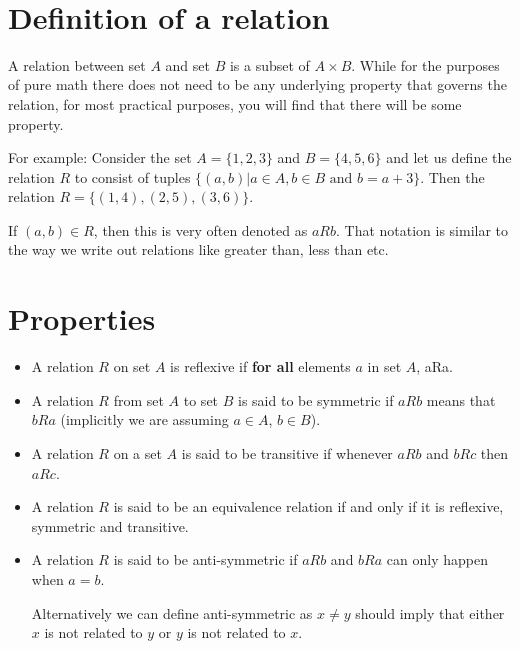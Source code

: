\documentclass[12pt]{article}
\begin{document}
\begin{center}
\\
\vspace{1cm}
\end{center}


\medskip\noindent


\vspace{0.5cm}\noindent

\section*{Definition of a relation}

A relation between set $A$ and set $B$ is a subset of $A \times B$. While for the purposes of pure math there does not need to be any underlying property that governs the relation, for most practical purposes, you will find that there will be some property.

For example: Consider the set $A = \{1,2,3\}$ and $B = \{4,5,6\}$ and let us define the relation $R$ to consist of tuples $\{(a,b)| a \in A, b \in B \text{ and } b = a + 3\}$.
Then the relation $R = \{(1,4) , (2,5), (3,6)\}$.

If $(a,b) \in R$, then this is very often denoted as $aRb$.
That notation is similar to the way we write out relations like greater than, less than etc.

\section*{Properties}

\begin{itemize}
\item A relation $R$ on set $A$ is reflexive if \textbf{for all} elements $a$ in set $A$, aRa. 
\item A relation $R$ from set $A$ to set $B$ is said to be symmetric if $aRb$ means that $bRa$ (implicitly we are assuming $a \in A$, $b \in B$).
\item A relation $R$ on a set $A$ is said to be transitive if whenever $aRb$ and $bRc$ then $aRc$. 
\item A relation $R$ is said to be an equivalence relation if and only if it is reflexive, symmetric and transitive.
\item A relation $R$ is said to be anti-symmetric if $aRb$ and $bRa$ can only happen when $a =b$.

Alternatively we can define anti-symmetric as $x \neq y$ should imply that either $x$ is not related to $y$ or $y$ is not related to $x$.

\end{itemize}
\end{document}
